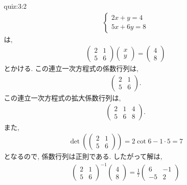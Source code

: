 \begin{answerof}{quiz:3:2}
  \begin{align*}
    \begin{cases}
      2x+y=4\\
      5x+6y=8
      \end{cases}
  \end{align*}
  は,
  \begin{align*}
    \begin{pmatrix}
      2&1\\5&6
    \end{pmatrix}
    \begin{pmatrix}
      x\\y
    \end{pmatrix}
    =
    \begin{pmatrix}
      4\\8
    \end{pmatrix}
  \end{align*}
  とかける.
  この連立一次方程式の係数行列は,
  \begin{align*}
    \begin{pmatrix}
      2&1\\5&6
    \end{pmatrix}.
  \end{align*}
  この連立一次方程式の拡大係数行列は,
  \begin{align*}
    \begin{pmatrix}
      2&1&4\\5&6&8
    \end{pmatrix}.
  \end{align*}
  また,
  \begin{align*}
    \det(
    \begin{pmatrix}
      2&1\\5&6
    \end{pmatrix})=2\cot 6-1\cdot 5=7
  \end{align*}
  となるので,
  係数行列は正則である.
  したがって解は,
  \begin{align*}
    \begin{pmatrix}
      2&1\\5&6
    \end{pmatrix}^{-1}
    \begin{pmatrix}
      4\\8
    \end{pmatrix}
    =
    \frac{1}{7}
    \begin{pmatrix}
      6&-1\\-5&2
    \end{pmatrix}

\end{align*}
\end{answerof}
